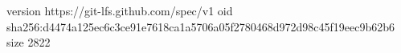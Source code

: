 version https://git-lfs.github.com/spec/v1
oid sha256:d4474a125ec6c3ce91e7618ca1a5706a05f2780468d972d98c45f19eec9b62b6
size 2822
